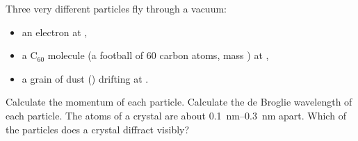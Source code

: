 Three very different particles fly through a vacuum:
\begin{itemize}
 \item an electron at \velO,
 \item a C$_{60}$ molecule (a football of 60 carbon atoms, mass \mcuO) at \vcO,
 \item a grain of dust (\mdO) drifting at \vdO.
\end{itemize}

\begin{abcliste}
\abc Calculate the momentum of each particle.
\abc Calculate the de Broglie wavelength of each particle.
\abc The atoms of a crystal are about \SIrange{0.1}{0.3}{\nano\meter} apart. Which of the particles does a crystal diffract visibly?
\end{abcliste}
